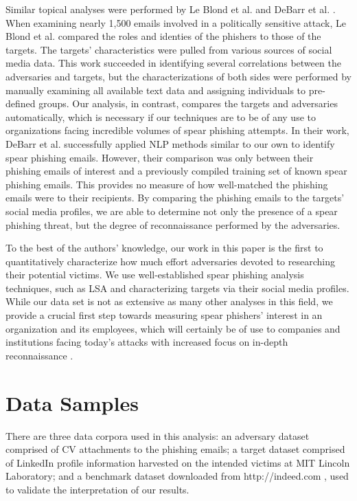 \documentclass[conference]{IEEEtran}
\begin{document}
Similar topical analyses were performed by Le Blond et al. \cite{le2014look} and DeBarr et al. \cite{debarr2013phishing}.  
When examining nearly 1,500 emails involved in a politically sensitive attack, Le Blond et al. compared the roles and identies of the phishers to those 
of the targets.  The targets' characteristics were pulled from various sources of social media data.  
This work succeeded in identifying several correlations between the adversaries and targets, but the 
characterizations of both sides were performed by manually examining all available text data 
and assigning individuals to pre-defined groups.  Our analysis, in contrast, compares the targets and adversaries automatically, which is necessary if our 
techniques are to be of any use to organizations facing incredible volumes of spear phishing attempts.  In their work, DeBarr et al. successfully applied 
NLP methods similar to our own to identify spear phishing emails.  However, their comparison was only between their phishing emails of interest and a 
previously compiled training set of known spear phishing emails.  This provides no measure of how well-matched the phishing emails were to their 
recipients.  By comparing the phishing emails to the targets' social media profiles, we are able to determine not only the presence of a spear phishing threat, 
but the degree of reconnaissance performed by the adversaries.

To the best of the authors' knowledge, our work in this paper is the first to quantitatively characterize how much effort adversaries devoted to 
researching their potential victims.  We use well-established spear phishing analysis techniques, such as LSA and characterizing 
targets via their social media profiles.  While our data set is not as extensive as many other analyses in this field, we provide a crucial first step towards 
measuring spear phishers' interest in an organization and its employees, which will certainly be of use to companies and institutions facing today's attacks 
with increased focus on in-depth reconnaissance \cite{symantec}.

\section{Data Samples}
There are three data corpora used in this analysis: an adversary dataset comprised of CV attachments to the phishing emails; a target dataset comprised of LinkedIn \cite{linkedin} profile 
information harvested on the intended victims at MIT Lincoln Laboratory; and a benchmark dataset downloaded from http://indeed.com \cite{indeed}, used to validate the
interpretation of our results.  
\end{document}
